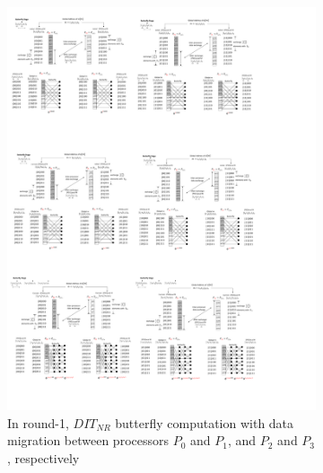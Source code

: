 \documentclass{iacrtrans}
\theoremstyle{plain}
\begin{document}
\begin{figure}[!tb]
\begin{subfigure}[b]{\textwidth}
\includegraphics[width=\textwidth]{./fig/DataSwapWithPerm2.pdf}
\caption{In round-1, $DIT_{NR}$ butterfly computation with data migration between processors $P_0$ and $P_1$, and $P_2$ and $P_3$, respectively}\label{fig:dataswap_with_perm2}
\end{subfigure}
\hspace{1em}
\begin{subfigure}[b]{\textwidth}

\end{subfigure}
\end{figure}
\end{document}

